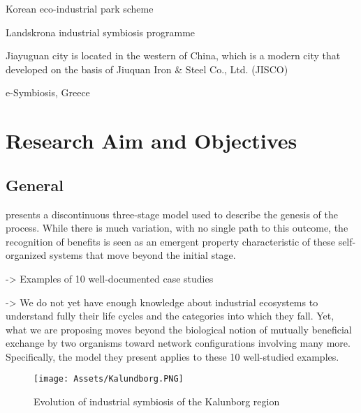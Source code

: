 Korean eco-industrial park scheme

Landskrona industrial symbiosis programme

Jiayuguan city is located in the western of China, which is a modern city that developed on the basis of Jiuquan Iron \& Steel Co., Ltd. (JISCO)

e-Symbiosis, Greece






\section{Research Aim and Objectives}































\subsection{General}
\textbf{}\par
\textcite{Chertow2012} presents a discontinuous three-stage model used to describe the genesis of the process. While there is much variation, with no single path to this outcome, the recognition of benefits is seen as an emergent property characteristic of these self-organized systems that move beyond the initial stage. \par
-> Examples of 10 well-documented case studies \par
-> We do not yet have enough knowledge about industrial ecosystems to understand fully their life cycles and the categories into which they fall. Yet, what we are proposing moves beyond the biological notion of mutually beneficial exchange by two organisms toward network configurations involving many more. Specifically, the model they present applies to these 10 well-studied examples.


\begin{figure}[h!]
    \centering
    \texttt{[image: Assets/Kalundborg.PNG]}
    \caption{Evolution of industrial symbiosis of the Kalunborg region}
    \label{fig:Kalundborg}
\end{figure}


